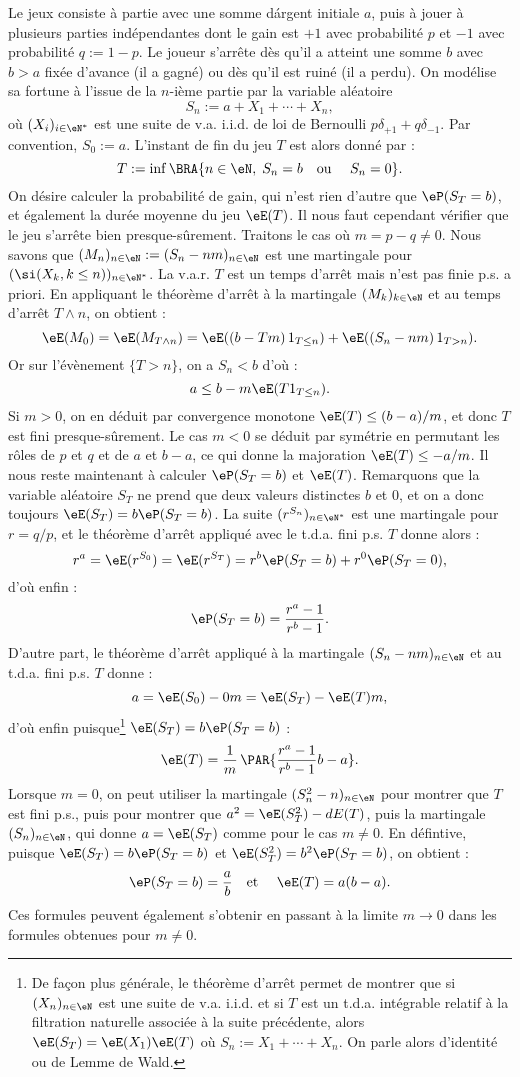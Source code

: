 {{Le jeux consiste à partie avec une somme dárgent initiale $a$, puis à
jouer à plusieurs parties indépendantes dont le gain est $+1$ avec
probabilité $p$ et $-1$ avec probabilité $q:=1-p$.  Le joueur s'arrête
dès qu'il a atteint une somme $b$ avec $b>a$ fixée d'avance (il a
gagné) ou dès qu'il est ruiné (il a perdu).  On modélise sa fortune à
l'issue de la $n$-ième partie par la variable aléatoire
$$
S_n:=a+X_1+\cdots+X_n,
$$
où $(X_i)_{i\in\eN^*}$ est une suite de v.a. i.i.d. de loi de
Bernoulli $p\delta_{+1}+q\delta_{-1}$. Par convention, $S_0:=a$.  L'instant
de fin du jeu $T$ est alors donné par :
$$
T:=\inf\BRA{n\in\eN,\; S_n=b \text{\quad ou \quad} S_n=0}.
$$
On désire calculer la probabilité de gain, qui n'est rien d'autre
que $\eP(S_T=b)$, et également la durée moyenne du jeu $\eE(T)$.  Il
nous faut cependant vérifier que le jeu s'arrête bien
presque-sûrement. Traitons le cas où $m=p-q\neq 0$. Nous savons que
$(M_n)_{n\in\eN}:=(S_n-nm)_{n\in\eN}$ est une martingale pour
$(\si(X_k,k\leq n))_{n\in\eN^*}$.  La v.a.r.  $T$ est un temps d'arrêt
mais n'est pas finie p.s. a priori.  En appliquant le théorème d'arrêt
à la martingale $(M_k)_{k\in\eN}$ et au temps d'arrêt $T\land n$, on
obtient :
$$
\eE(M_0)=\eE(M_{T\land n})
=\eE((b-Tm)\,\mathrm{1}_{T\leq n})+\eE((S_n-nm)\,\mathrm{1}_{T>n}).
$$
Or sur l'évènement $\{T>n\}$, on a $S_n<b$ d'où :
$$
a\leq b-m\eE(T\mathrm{1}_{T\leq n}).
$$
Si $m>0$, on en déduit par convergence monotone $\eE(T)\leq
(b-a)/m$, et donc $T$ est fini presque-sûrement. Le cas $m<0$ se
déduit par symétrie en permutant les rôles de $p$ et $q$ et de $a$ et
$b-a$, ce qui donne la majoration $\eE(T)\leq -a/m$.  Il nous reste
maintenant à calculer $\eP(S_T=b)$ et $\eE(T)$.  Remarquons que la
variable aléatoire $S_T$ ne prend que deux valeurs distinctes $b$ et
$0$, et on a donc toujours $\eE(S_T)=b\eP(S_T=b)$.  La suite
$(r^{S_n})_{n\in\eN^*}$ est une martingale pour $r=q/p$, et le
théorème d'arrêt appliqué avec le t.d.a. fini p.s. $T$ donne alors :
$$
r^a=\eE(r^{S_0})=\eE(r^{S_T})=r^b\eP(S_T=b)+r^0\eP(S_T=0),
$$
d'où enfin :
$$
\eP(S_T=b)=\frac{r^a-1}{r^b-1}.
$$
D'autre part, le théorème d'arrêt appliqué à la martingale 
$(S_n-nm)_{n\in\eN}$ et au t.d.a. fini p.s. $T$ donne :
$$
a=\eE(S_0)-0m=\eE(S_T)-\eE(T)m,
$$
d'où enfin puisque\footnote{De façon plus générale, le théorème
  d'arrêt permet de montrer que si $(X_n)_{n\in\eN}$ est une suite de
  v.a. i.i.d. et si $T$ est un t.d.a. intégrable relatif à la
  filtration naturelle associée à la suite précédente, alors
  $\eE(S_T)=\eE(X_1)\eE(T)$ où $S_n:=X_1+\cdots+X_n$. On parle alors
  d'identité ou de Lemme de Wald.}  $\eE(S_T)=b\eP(S_T=b)$ :
$$
\eE(T)=\frac{1}{m}\,\PAR{\frac{r^a-1}{r^b-1}b-a}.
$$
Lorsque $m=0$, on peut utiliser la martingale $(S_n^2-n)_{n\in\eN}$
pour montrer que $T$ est fini p.s., puis pour montrer que
$a^2=\eE(S_T^2)-dE(T)$, puis la martingale $(S_n)_{n\in\eN}$, qui
donne $a=\eE(S_T)$ comme pour le cas $m\neq 0$. En défintive, puisque
$\eE(S_T)=b\eP(S_T=b)$ et $\eE(S_T^2)=b^2\eP(S_T=b)$, on obtient :
$$
\eP(S_T=b)=\frac{a}{b}
\text{\quad et \quad} 
\eE(T)= a(b-a).
$$
Ces formules peuvent également s'obtenir en passant à la limite
$m\to0$ dans les formules obtenues pour $m\neq 0$.

}}
